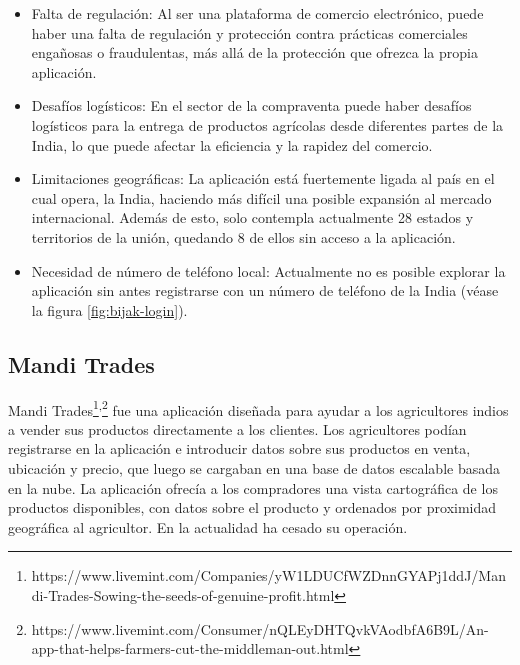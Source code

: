 \begin{itemize}

	\item Falta de regulación: Al ser una plataforma de comercio electrónico, puede haber una falta de regulación y protección contra prácticas comerciales engañosas o fraudulentas, más allá de la protección que ofrezca la propia aplicación.
	
	\item Desafíos logísticos: En el sector de la compraventa puede haber desafíos logísticos para la entrega de productos agrícolas desde diferentes partes de la India, lo que puede afectar la eficiencia y la rapidez del comercio.

	\item Limitaciones geográficas: La aplicación está fuertemente ligada al país en el cual opera, la India, haciendo más difícil una posible expansión al mercado internacional. Además de esto, solo contempla actualmente 28 estados y territorios de la unión, quedando 8 de ellos sin acceso a la aplicación.

	\item Necesidad de número de teléfono local: Actualmente no es posible explorar la aplicación sin antes registrarse con un número de teléfono de la India (véase la figura \ref{fig:bijak-login}).
	
\end{itemize}


\subsection{Mandi Trades}

Mandi Trades\footnote{https://www.livemint.com/Companies/yW1LDUCfWZDnnGYAPj1ddJ/Mandi-Trades-Sowing-the-seeds-of-genuine-profit.html}\textsuperscript{,}\footnote{https://www.livemint.com/Consumer/nQLEyDHTQvkVAodbfA6B9L/An-app-that-helps-farmers-cut-the-middleman-out.html} fue una aplicación diseñada para ayudar a los agricultores indios a vender sus productos directamente a los clientes. Los agricultores podían registrarse en la aplicación e introducir datos sobre sus productos en venta, ubicación y precio, que luego se cargaban en una base de datos escalable basada en la nube. La aplicación ofrecía a los compradores una vista cartográfica de los productos disponibles, con datos sobre el producto y ordenados por proximidad geográfica al agricultor. En la actualidad ha cesado su operación.

